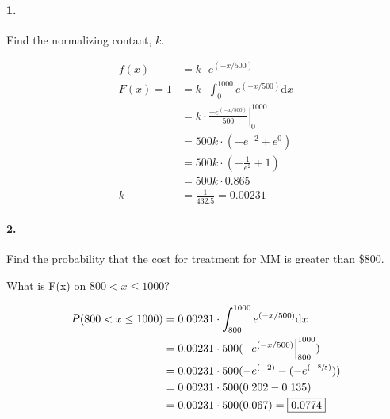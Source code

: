     \paragraph*{1.}
    Find the normalizing contant, $k$.
    \\
    \begin{mdframed}
        \begin{align*}
            f(x)    & = k \cdot e^{(-x/500)}                                        \\
            F(x) = 1& = k \cdot \int_{0}^{1000}e^{(-x/500)}\mathrm{d}x              \\
                    & = k \cdot \left.\frac{-e^{(-x/500)}}{500}\right|_{0}^{1000}   \\
                    & = 500k \cdot (-e^{-2} + e^{0})                                \\
                    & = 500k \cdot (-\frac{1}{e^2} + 1)                             \\
                    & = 500k \cdot 0.865                                            \\
            k       & = \frac{1}{432.5} = \boxed{0.00231}
        \end{align*}
    \end{mdframed}

    \paragraph*{2.}
    Find the probability that the cost for treatment for MM is greater than \$800.
    \\
    \begin{mdframed}
        What is F(x) on $800 < x \leq 1000$?

        \begin{align*}
            P(800<x\leq1000)& = 0.00231 \cdot \int_{800}^{1000}e^{(-x/500)}\mathrm{d}x  \\
                            & = 0.00231 \cdot 500(-e^{(-x/500)}\Big|_{800}^{1000})      \\
                            & = 0.00231 \cdot 500(-e^{(-2)} - (- e^{(-\sfrac{8}{5})}))  \\
                            & = 0.00231 \cdot 500(0.202 - 0.135)                        \\
                            & = 0.00231 \cdot 500(0.067) = \boxed{0.0774}
        \end{align*}
    \end{mdframed}

